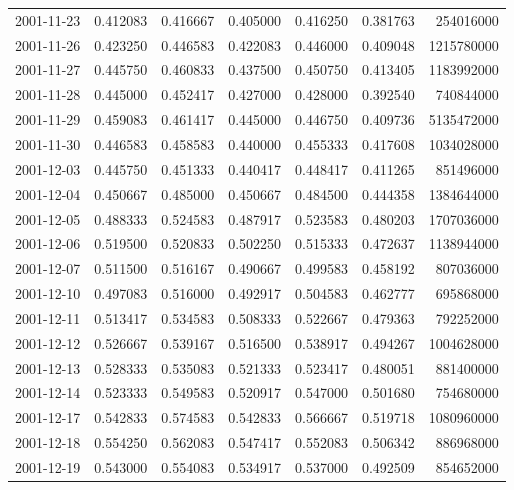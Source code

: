 \begin{tabular}{lrrrrrr}
2001-11-23 &    0.412083 &    0.416667 &    0.405000 &    0.416250 &    0.381763 &   254016000 \\
2001-11-26 &    0.423250 &    0.446583 &    0.422083 &    0.446000 &    0.409048 &  1215780000 \\
2001-11-27 &    0.445750 &    0.460833 &    0.437500 &    0.450750 &    0.413405 &  1183992000 \\
2001-11-28 &    0.445000 &    0.452417 &    0.427000 &    0.428000 &    0.392540 &   740844000 \\
2001-11-29 &    0.459083 &    0.461417 &    0.445000 &    0.446750 &    0.409736 &  5135472000 \\
2001-11-30 &    0.446583 &    0.458583 &    0.440000 &    0.455333 &    0.417608 &  1034028000 \\
2001-12-03 &    0.445750 &    0.451333 &    0.440417 &    0.448417 &    0.411265 &   851496000 \\
2001-12-04 &    0.450667 &    0.485000 &    0.450667 &    0.484500 &    0.444358 &  1384644000 \\
2001-12-05 &    0.488333 &    0.524583 &    0.487917 &    0.523583 &    0.480203 &  1707036000 \\
2001-12-06 &    0.519500 &    0.520833 &    0.502250 &    0.515333 &    0.472637 &  1138944000 \\
2001-12-07 &    0.511500 &    0.516167 &    0.490667 &    0.499583 &    0.458192 &   807036000 \\
2001-12-10 &    0.497083 &    0.516000 &    0.492917 &    0.504583 &    0.462777 &   695868000 \\
2001-12-11 &    0.513417 &    0.534583 &    0.508333 &    0.522667 &    0.479363 &   792252000 \\
2001-12-12 &    0.526667 &    0.539167 &    0.516500 &    0.538917 &    0.494267 &  1004628000 \\
2001-12-13 &    0.528333 &    0.535083 &    0.521333 &    0.523417 &    0.480051 &   881400000 \\
2001-12-14 &    0.523333 &    0.549583 &    0.520917 &    0.547000 &    0.501680 &   754680000 \\
2001-12-17 &    0.542833 &    0.574583 &    0.542833 &    0.566667 &    0.519718 &  1080960000 \\
2001-12-18 &    0.554250 &    0.562083 &    0.547417 &    0.552083 &    0.506342 &   886968000 \\
2001-12-19 &    0.543000 &    0.554083 &    0.534917 &    0.537000 &    0.492509 &   854652000 \\

\end{tabular}
